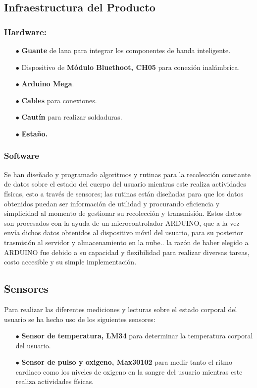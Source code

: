 \documentclass[osajnl,twocolumn,showpacs,superscriptaddress,10pt]{revtex4-1}
\begin{document}
\subsection{Infraestructura del Producto}
\subsubsection{Hardware:}
\begin{itemize}
    \item[$\bullet$]\textbf{Guante} de lana para integrar los componentes de banda inteligente.
    \item[$\bullet$]Dispositivo de \textbf{Módulo Bluethoot, CH05} para conexión inalámbrica.
    \item[$\bullet$]\textbf{Arduino Mega}.
    \item[$\bullet$]\textbf{Cables} para conexiones.
    \item[$\bullet$]\textbf{Cautín} para realizar soldaduras.
    \item[$\bullet$]\textbf{Estaño.}
\end{itemize}
\subsubsection{Software}
    Se han diseñado y programado algoritmos y rutinas para la recolección constante de datos sobre el estado del cuerpo del usuario mientras este realiza actividades físicas, esto a través de sensores; las rutinas están diseñadas para que los datos obtenidos puedan ser información de utilidad y procurando eficiencia y simplicidad al momento de gestionar su recolección y transmisión. Estos datos son procesados con la ayuda de un microcontrolador ARDUINO, que a la vez envía dichos datos obtenidos al dispositivo móvil del usuario, para su posterior trasmisión al servidor y almacenamiento en la nube.. la razón de haber elegido a ARDUINO fue debido a su capacidad y flexibilidad para realizar diversas tareas, costo accesible y su simple implementación.
    
\subsection{Sensores}
Para realizar las diferentes mediciones y lecturas sobre el estado corporal del usuario se ha hecho uso de los siguientes sensores:
\begin{itemize}
    \item[$\bullet$]\textbf{Sensor de temperatura, LM34} para determinar la temperatura corporal del usuario.
    \item[$\bullet$]\textbf{Sensor de pulso y oxigeno, Max30102} para medir tanto el ritmo cardiaco como los niveles de oxigeno en la sangre del usuario mientras este realiza actividades físicas.
\end{itemize}
\end{document}
